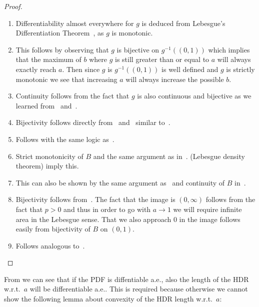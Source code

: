 \begin{proof}
\begin{enumerate}
        \item\label{item:differentiability} Differentiability almost everywhere for \(g\) is deduced from Lebesgue's Differentiation Theorem~\cite{hewitt2012real}, as \(g\) is monotonic. 

        \item\label{item:monotonicity2} This follows by observing that $g$ is bijective on $g^{-1}((0,1))$ which implies that the maximum of $b$ where $g$ is still greater than or equal to $a$ will always exactly reach $a$. Then since $g$ is $g^{-1}((0,1))$ is well defined and $g$ is strictly monotonic we see that increasing $a$ will always increase the possible $b$.

        \item\label{item:continuity2} Continuity follows from the fact that $g$ is also continuous and bijective as we learned from~ and~.

        \item Bijectivity follows directly from~ and~ similar to~.

        \item Follows with the same logic as~.

        \item\label{item:monotonicity3} Strict monotonicity of $B$ and the same argument as in~. (Lebesgue density theorem) imply this.

        \item This can also be shown by the same argument as~ and continuity of $B$ in~.

        \item Bijectivity follows from~. The fact that the image is $(0,\infty)$ follows from the fact that $p>0$ and thus in order to go with $a \to 1$ we will require infinite area in the Lebesgue sense. That we also approach $0$ in the image follows easily from bijectivity of $B$ on $(0,1)$.

        \item Follows analogous to~.

    \end{enumerate}
\end{proof}

From  we can see that if the PDF is diffentiable a.e., also the length of the HDR w.r.t.\ $a$ will be differentiable a.e.. This is required because otherwise we cannot show the following lemma about convexity of the HDR length w.r.t.\ $a$:

